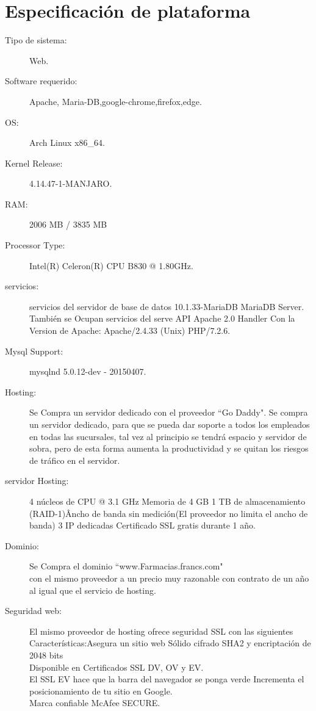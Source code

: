 \section{Especificación de plataforma}	

\begin{description}

	\item[Tipo de sistema:] Web.
	\item[Software requerido:]Apache, Maria-DB,google-chrome,firefox,edge.
	\item[OS:] Arch Linux x86\_64.
	\item[Kernel Release:] 4.14.47-1-MANJARO.
	\item[RAM:] 2006 MB / 3835 MB
	\item[Processor Type:] Intel(R) Celeron(R) CPU B830 @ 1.80GHz.
	\item[servicios:] servicios del servidor de base de datos 10.1.33-MariaDB MariaDB Server.\\También se Ocupan servicios del serve API Apache 2.0 Handler
Con la Version de Apache:	Apache/2.4.33 (Unix) PHP/7.2.6.
	\item[Mysql Support:] mysqlnd 5.0.12-dev - 20150407.
	\item[Hosting:]Se Compra un servidor dedicado con el proveedor ``Go Daddy".
	Se compra un servidor dedicado, para que se pueda dar soporte a  todos los empleados en todas las sucursales, tal vez al principio se tendrá espacio y servidor de sobra, pero de esta forma aumenta la productividad y se quitan los riesgos de tráfico en el servidor.
	\item[servidor Hosting:]4 núcleos de CPU @ 3.1 GHz
Memoria de 4 GB
1 TB de almacenamiento (RAID-1)\^
Ancho de banda sin medición(El proveedor no limita el ancho de banda) 
3 IP dedicadas
Certificado SSL gratis durante 1 año.
	\item[Dominio:] Se Compra el dominio ``www.Farmacias.francs.com"\\  con el mismo proveedor a un precio muy razonable con contrato de un año al igual que el servicio de hosting.
	\item[Seguridad web:]El mismo proveedor de hosting ofrece seguridad SSL
	con las siguientes Características:Asegura un sitio web
Sólido cifrado SHA2 y encriptación de 2048 bits\\
Disponible en Certificados SSL DV, OV y EV.\\
El SSL EV hace que la barra del navegador se ponga verde 
Incrementa el posicionamiento de tu sitio en Google.\\
Marca confiable McAfee SECURE.\\
\end{description}
